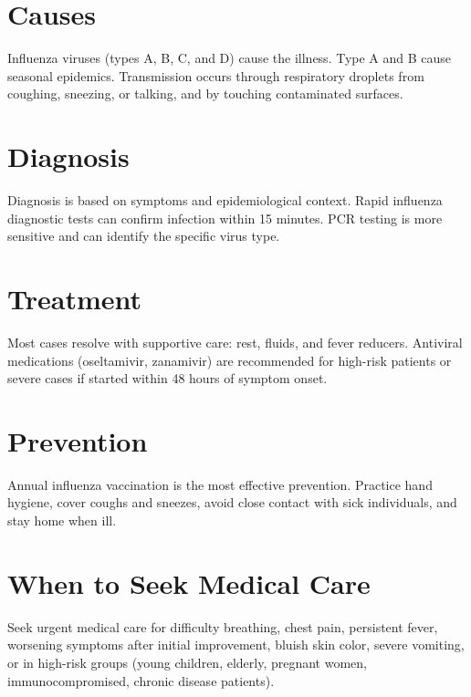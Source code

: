 \section*{Causes}
Influenza viruses (types A, B, C, and D) cause the illness. Type A and B cause seasonal epidemics. Transmission occurs through respiratory droplets from coughing, sneezing, or talking, and by touching contaminated surfaces.

\section*{Diagnosis}
Diagnosis is based on symptoms and epidemiological context. Rapid influenza diagnostic tests can confirm infection within 15 minutes. PCR testing is more sensitive and can identify the specific virus type.

\section*{Treatment}
Most cases resolve with supportive care: rest, fluids, and fever reducers. Antiviral medications (oseltamivir, zanamivir) are recommended for high-risk patients or severe cases if started within 48 hours of symptom onset.

\section*{Prevention}
Annual influenza vaccination is the most effective prevention. Practice hand hygiene, cover coughs and sneezes, avoid close contact with sick individuals, and stay home when ill.

\section*{When to Seek Medical Care}
Seek urgent medical care for difficulty breathing, chest pain, persistent fever, worsening symptoms after initial improvement, bluish skin color, severe vomiting, or in high-risk groups (young children, elderly, pregnant women, immunocompromised, chronic disease patients).
\clearpage
